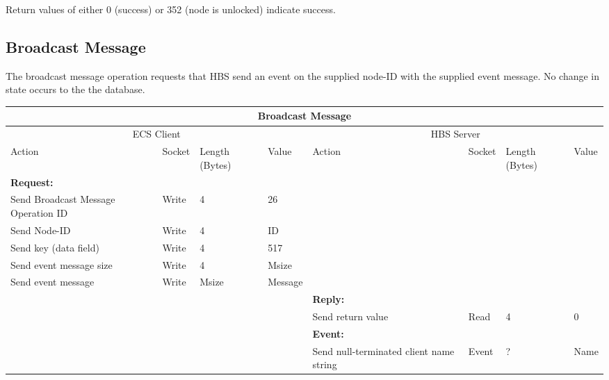 Return values of either 0 (success) or 352  (node is unlocked)
indicate success.



\newpage
\subsection{Broadcast Message}

The broadcast message operation requests that HBS send an event 
on the supplied node-ID with the supplied event message. No change in 
state occurs to the the database.


\bigskip
\small
\begin{tabular}{|p{1.2in}|p{.4in}|p{.4in}|p{.5in}|p{1.2in}|p{.4in}|p{.4in}|p{.5in} |} \hline
\multicolumn{8}{|c|}{{\bf Broadcast Message}} \\ \hline
\multicolumn{4}{|c|}{ECS Client} & \multicolumn{4}{|c|}{HBS Server} \\ \hline
Action            & Socket & Length  
                            (Bytes)& Value & Action       & Socket & Length 
                                                                    (Bytes)& Value \\ \hline
\multicolumn{4}{|l}{{\bf Request:}}&\multicolumn{4}{|l|}{~} \\ \hline
Send Broadcast Message Operation ID  & Write  & 4     & 26     &              &        &       &       \\ \hline
Send Node-ID      & Write  & 4     &  ID &           &        &       &       \\ \hline
Send key (data field)    & Write  & 4     & 517   &              &        &       &       \\ \hline
Send event
message size      & Write  & 4     &  Msize &         &        &       &       \\ \hline
Send event message
                  & Write  &  Msize  &  Message &     &        &       &       \\ \hline
\multicolumn{4}{|l}{~}&\multicolumn{4}{|l|}{{\bf Reply:}} \\ \hline
                  &        &       &       & Send return
                                             value        & Read   &  4    & 0       \\ \hline
\multicolumn{4}{|l}{~}&\multicolumn{4}{|l|}{{\bf Event:}} \\ \hline
                  &        &       &       & Send null-terminated client
                                             name string  & Event  &  ?    & Name  \\ \hline

\end{tabular}
